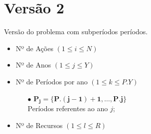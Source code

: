 \section{Versão 2}

Versão do problema com subperíodos períodos.


\begin{itemize}
  \item {} Nº de Ações {\scriptsize $(1 \leq i \leq N) $}
  \item {} Nº de Anos  {\scriptsize $(1 \leq j \leq Y) $}
  \item {} Nº de Períodos por ano {\scriptsize $(1 \leq k \leq P.Y)$}
    \begin{itemize}
	  \item[$\bullet$]{\small $\bm{P_{j} = \{P.(j-1)+1, \ldots, P.j\}}$ \\ Períodos referentes ao ano $j$;} 
	\end{itemize}
  \item {} Nº de Recursos {\scriptsize $(1 \leq l \leq R)$}
\end{itemize}


